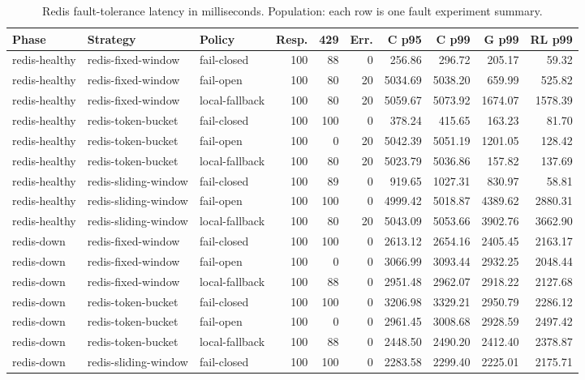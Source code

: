 \documentclass[conference]{IEEEtran}
\begin{document}
\begin{table}[t]
\centering
\tiny
\caption{Redis fault-tolerance latency in milliseconds. Population: each row is one fault experiment summary.}
\label{tab:fault}
\begin{tabular}{lllrrrrrrr}
\hline
Phase & Strategy & Policy & Resp. & 429 & Err. & C p95 & C p99 & G p99 & RL p99 \\
\hline
redis-healthy & redis-fixed-window & fail-closed & 100 & 88 & 0 & 256.86 & 296.72 & 205.17 & 59.32 \\
redis-healthy & redis-fixed-window & fail-open & 100 & 80 & 20 & 5034.69 & 5038.20 & 659.99 & 525.82 \\
redis-healthy & redis-fixed-window & local-fallback & 100 & 80 & 20 & 5059.67 & 5073.92 & 1674.07 & 1578.39 \\
redis-healthy & redis-token-bucket & fail-closed & 100 & 100 & 0 & 378.24 & 415.65 & 163.23 & 81.70 \\
redis-healthy & redis-token-bucket & fail-open & 100 & 0 & 20 & 5042.39 & 5051.19 & 1201.05 & 128.42 \\
redis-healthy & redis-token-bucket & local-fallback & 100 & 80 & 20 & 5023.79 & 5036.86 & 157.82 & 137.69 \\
redis-healthy & redis-sliding-window & fail-closed & 100 & 89 & 0 & 919.65 & 1027.31 & 830.97 & 58.81 \\
redis-healthy & redis-sliding-window & fail-open & 100 & 100 & 0 & 4999.42 & 5018.87 & 4389.62 & 2880.31 \\
redis-healthy & redis-sliding-window & local-fallback & 100 & 80 & 20 & 5043.09 & 5053.66 & 3902.76 & 3662.90 \\
redis-down & redis-fixed-window & fail-closed & 100 & 100 & 0 & 2613.12 & 2654.16 & 2405.45 & 2163.17 \\
redis-down & redis-fixed-window & fail-open & 100 & 0 & 0 & 3066.99 & 3093.44 & 2932.25 & 2048.44 \\
redis-down & redis-fixed-window & local-fallback & 100 & 88 & 0 & 2951.48 & 2962.07 & 2918.22 & 2127.68 \\
redis-down & redis-token-bucket & fail-closed & 100 & 100 & 0 & 3206.98 & 3329.21 & 2950.79 & 2286.12 \\
redis-down & redis-token-bucket & fail-open & 100 & 0 & 0 & 2961.45 & 3008.68 & 2928.59 & 2497.42 \\
redis-down & redis-token-bucket & local-fallback & 100 & 88 & 0 & 2448.50 & 2490.20 & 2412.40 & 2378.87 \\
redis-down & redis-sliding-window & fail-closed & 100 & 100 & 0 & 2283.58 & 2299.40 & 2225.01 & 2175.71 \\

\end{tabular}
\end{table}
\end{document}
